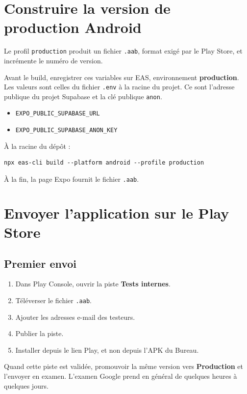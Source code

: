 \documentclass[11pt,a4paper]{article}
\newcommand{\code}[1]{\texttt{#1}}
\begin{document}
\section{Construire la version de production Android}

Le profil \code{production} produit un fichier \code{.aab}, format exigé par le Play Store, et incrémente le numéro de version.

Avant le build, enregistrer ces variables sur EAS, environnement \textbf{production}. Les valeurs sont celles du fichier \code{.env} à la racine du projet. Ce sont l'adresse publique du projet Supabase et la clé publique \code{anon}.

\begin{itemize}
  \item \code{EXPO\_PUBLIC\_SUPABASE\_URL}
  \item \code{EXPO\_PUBLIC\_SUPABASE\_ANON\_KEY}
\end{itemize}

À la racine du dépôt :

\begin{verbatim}
npx eas-cli build --platform android --profile production
\end{verbatim}

À la fin, la page Expo fournit le fichier \code{.aab}.

\section{Envoyer l'application sur le Play Store}

\subsection{Premier envoi}

\begin{enumerate}
  \item Dans Play Console, ouvrir la piste \textbf{Tests internes}.
  \item Téléverser le fichier \code{.aab}.
  \item Ajouter les adresses e-mail des testeurs.
  \item Publier la piste.
  \item Installer depuis le lien Play, et non depuis l'APK du Bureau.
\end{enumerate}

Quand cette piste est validée, promouvoir la même version vers \textbf{Production} et l'envoyer en examen. L'examen Google prend en général de quelques heures à quelques jours.
\end{document}
